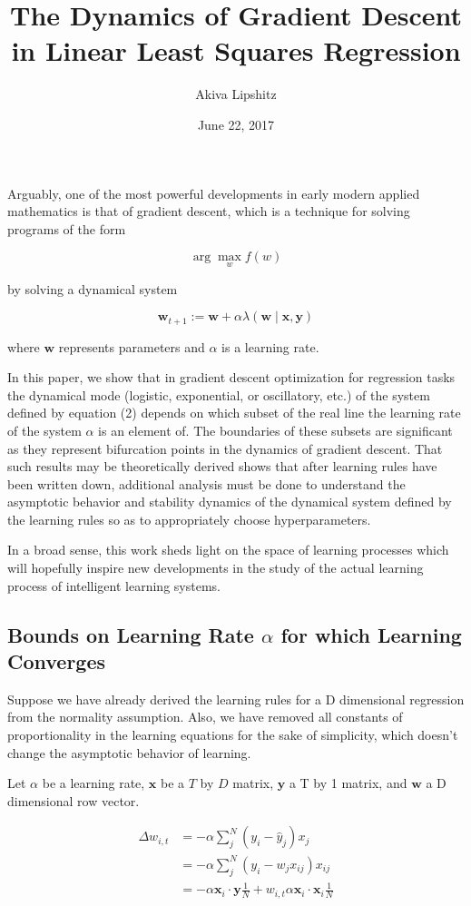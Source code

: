 \documentclass[]{article}
\title{The Dynamics of Gradient Descent in Linear Least Squares Regression}
\author{Akiva Lipshitz}
\date{June 22, 2017}
\begin{document}
\maketitle

Arguably, one of the most powerful developments in early modern applied
mathematics is that of gradient descent, which is a technique for
solving programs of the form

\[
\arg\max _w f(w)
\]

by solving a dynamical system

\[
\mathbf{w}_{t+1} := \mathbf{w}+\alpha\lambda(\mathbf{w}\mid \mathbf{x}, \mathbf{y})
\]

where \(\mathbf{w}\) represents parameters and \(\alpha\) is a learning rate.

In this paper, we show that in gradient descent optimization for regression tasks the dynamical mode (logistic, exponential, or oscillatory, etc.) of the system defined by equation (2)
depends on which subset of the real line the learning rate of the system \(\alpha\) is an element of.
The boundaries of these subsets are significant as they represent bifurcation points in the dynamics of gradient descent.
That such results may be theoretically derived shows that after learning
rules have been written down, additional analysis must be done to
understand the asymptotic behavior and stability dynamics of the
dynamical system defined by the learning rules so as to appropriately
choose hyperparameters.

In a broad sense, this work sheds light on the space of learning processes which will hopefully inspire new developments in the study of the actual learning process of intelligent learning systems.

\subsection{Bounds on Learning Rate \(\alpha\) for which Learning Converges}
Suppose we have already derived the learning rules for a D dimensional
regression from the normality assumption. Also, we have removed all
constants of proportionality in the learning equations for the sake of
simplicity, which doesn't change the asymptotic behavior of learning.

Let \(\alpha\) be a learning rate, \(\mathbf{x}\) be a \(T\) by \(D\)
matrix, \(\mathbf{y}\) a T by 1 matrix, and \(\mathbf{w}\) a D
dimensional row vector.

\begin{align}
\Delta w_{i,t} &= -\alpha \sum\limits^N_j (y_i-\hat{y}_j)x_j \\
&= -\alpha \sum\limits^N_j (y_i-w_jx_{ij})x_{ij}\\
&= -\alpha \mathbf{x}_i\cdot\mathbf{y}\frac{1}{N} + w_{i,t}\alpha \mathbf{x}_i\cdot\mathbf{x}_i\frac{1}{N}
\end{align}
\end{document}

